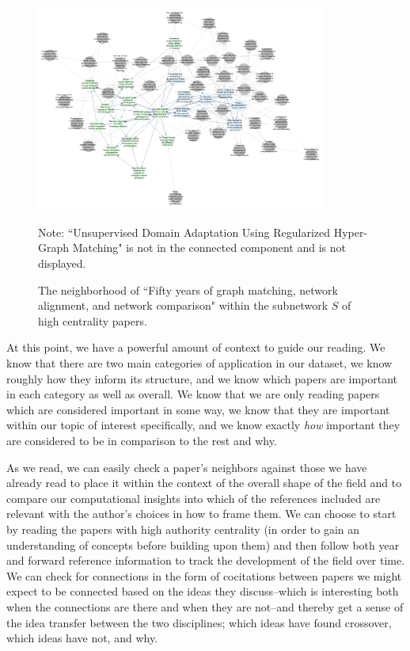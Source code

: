 \documentclass[12pt]{thesis}
\theoremstyle{plain}
\theoremstyle{definition}
\theoremstyle{remark}
\begin{document}
\begin{figure}
\centering
\includegraphics[width=0.85\textwidth]{reading_list_neighborhood0pt9crop.png}
\caption{The neighborhood of ``Fifty years of graph matching, network alignment, and network comparison" \cite{Emmert_Streib_2016} within the subnetwork $S$ of high centrality papers.}
\vspace{-12pt}\flushleft\scriptsize Note: ``Unsupervised Domain Adaptation Using Regularized Hyper-Graph Matching" is not in the connected component and is not displayed.
\label{fig:reading_list_neighborhood}
\end{figure}

At this point, we have a powerful amount of context to guide our reading. We know that there are two main categories of application in our dataset, we know roughly how they inform its structure, and we know which papers are important in each category as well as overall. We know that we are only reading papers which are considered important in some way, we know that they are important within our topic of interest specifically, and we know exactly \textit{how} important they are considered to be in comparison to the rest and why. 

As we read, we can easily check a paper's neighbors against those we have already read to place it within the context of the overall shape of the field and to compare our computational insights into which of the references included are relevant with the author's choices in how to frame them. We can choose to start by reading the papers with high authority centrality (in order to gain an understanding of concepts before building upon them) and then follow both year and forward reference information to track the development of the field over time. We can check for connections in the form of cocitations between papers we might expect to be connected based on the ideas they discuss--which is interesting both when the connections are there and when they are not--and thereby get a sense of the idea transfer between the two disciplines; which ideas have found crossover, which ideas have not, and why. 
\end{document}
